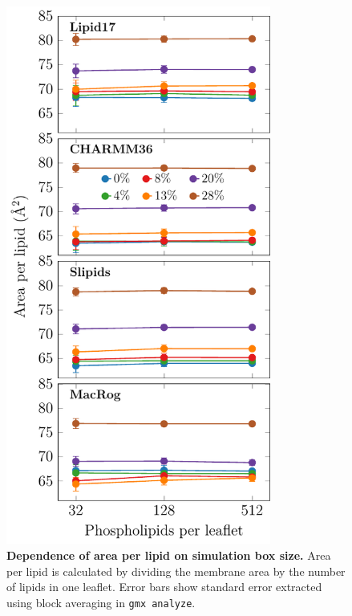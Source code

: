 \documentclass[journal=jpcbfk]{achemso}
\begin{document}
\begin{figure}[htb!]
    \centering
    \includegraphics[width=8.7cm]{../FIGS/apl_vs_size.pdf}
    \caption{\label{SIfig:aplvssize}%
     \textbf{Dependence of area per lipid on simulation box size.} Area per lipid is calculated by dividing the membrane area by the number of lipids in one leaflet. Error bars show standard error extracted using block averaging in \texttt{gmx analyze}.
    }
\end{figure}
\end{document}
